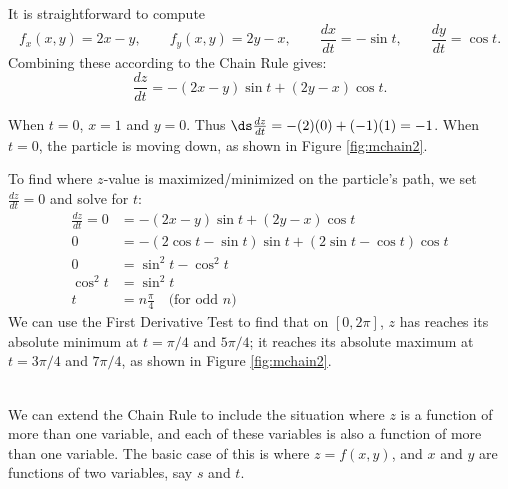 {It is straightforward to compute
\[
f_x(x,y) = 2x-y,\qquad f_y(x,y) = 2y-x,\qquad \frac{dx}{dt} = -\sin t,\qquad \frac{dy}{dt} = \cos t.
\]
Combining these according to the Chain Rule gives:
\[
\frac{dz}{dt} = -(2x-y)\sin t + (2y-x)\cos t.
\]

When $t=0$, $x=1$ and $y=0$. Thus $\ds\frac{dz}{dt} = -(2)(0)+ (-1)(1) = -1$. When $t=0$, the particle is moving down, as shown in Figure \ref{fig:mchain2}. 

To find where $z$-value is maximized/minimized on the particle's path, we set $\frac{dz}{dt}=0$ and solve for $t$:
\begin{align*}
\frac{dz}{dt} =0 &= -(2x-y)\sin t + (2y-x)\cos t\\
			0&= -(2\cos t-\sin t)\sin t+(2\sin t-\cos t)\cos t\\
			0&= \sin^2t-\cos^2t\\
\cos^2t &=\sin^2t\\
	t&= n\frac{\pi}4\quad \text{(for odd $n$)}
\end{align*}
We can use the First Derivative Test to find that on $[0,2\pi]$, $z$ has reaches its absolute minimum at $t=\pi/4$ and $5\pi/4$; it reaches its absolute maximum at $t=3\pi/4$ and $7\pi/4$, as shown in Figure \ref{fig:mchain2}.
}\\


We can extend the Chain Rule to include the situation where $z$ is a function of more than one variable, and each of these variables is also a function of more than one variable. The basic case of this is where $z=f(x,y)$, and $x$ and $y$ are functions of two variables, say $s$ and $t$. \\

